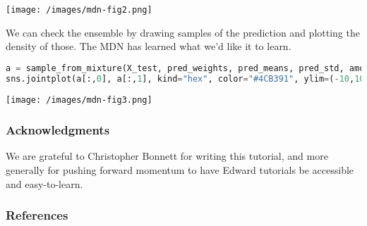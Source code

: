 \texttt{[image: /images/mdn-fig2.png]}

We can check the ensemble by drawing samples of the prediction and
plotting the density of those. The MDN has learned what we'd like it
to learn.

\begin{lstlisting}[language=Python]
a = sample_from_mixture(X_test, pred_weights, pred_means, pred_std, amount=len(X_test))
sns.jointplot(a[:,0], a[:,1], kind="hex", color="#4CB391", ylim=(-10,10), xlim=(-14,14))
\end{lstlisting}

\texttt{[image: /images/mdn-fig3.png]}

\subsubsection{Acknowledgments}

We are grateful to Christopher Bonnett for writing this tutorial, and
more generally for pushing forward momentum to have Edward tutorials
be accessible and easy-to-learn.

\subsubsection{References}\label{references}
